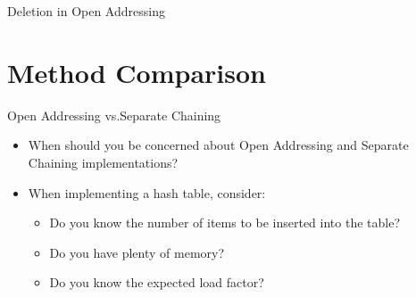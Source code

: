 \documentclass[14pt,aspectratio=1610]{beamer}
\begin{document}
\begin{frame}{Deletion in Open Addressing}
{%
}%

\end{frame}

\section*{Method Comparison}
\begin{frame}{Open Addressing vs.Separate Chaining}
\begin{itemize}
  \item
    When should you be concerned about Open Addressing and Separate Chaining implementations?
  \item<-2>
    When implementing a hash table, consider:
    \begin{itemize}
      \item
        Do you know the number of items to be inserted into the table?
      \item
        Do you have plenty of memory?
      \item
        Do you know the expected load factor?
    \end{itemize}
\end{itemize}
\end{frame}
\end{document}
